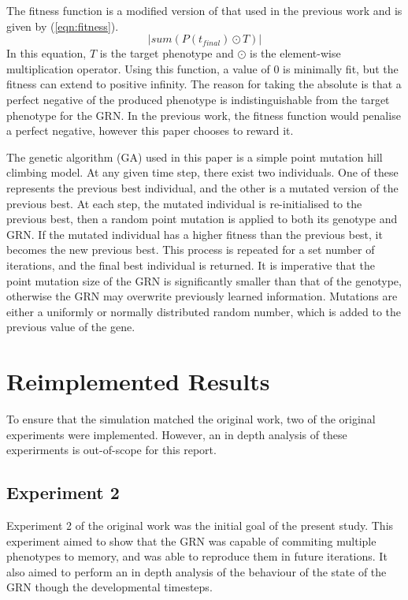 \documentclass[twocolumn,a4paper,11pt]{article}
\begin{document}
    The fitness function is a modified version of that used in the previous work and is given by (\ref{eqn:fitness}).
    \begin{equation} \label{eqn:fitness}
        |{sum} (P(t_{final}) \odot T)|
    \end{equation}
    In this equation, $T$ is the target phenotype and $\odot$ is the element-wise multiplication operator. Using this function, a value of 0 is minimally fit, but the fitness can extend to positive infinity. The reason for taking the absolute is that a perfect negative of the produced phenotype is indistinguishable from the target phenotype for the GRN. In the previous work, the fitness function would penalise a perfect negative, however this paper chooses to reward it.

    The genetic algorithm (GA) used in this paper is a simple point mutation hill climbing model. At any given time step, there exist two individuals. One of these represents the previous best individual, and the other is a mutated version of the previous best. At each step, the mutated individual is re-initialised to the previous best, then a random point mutation is applied to both its genotype and GRN. If the mutated individual has a higher fitness than the previous best, it becomes the new previous best. This process is repeated for a set number of iterations, and the final best individual is returned. It is imperative that the point mutation size of the GRN is significantly smaller than that of the genotype, otherwise the GRN may overwrite previously learned information. Mutations are either a uniformly or normally distributed random number, which is added to the previous value of the gene.

    \section{Reimplemented Results}
    To ensure that the simulation matched the original work, two of the original experiments were implemented. However, an in depth analysis of these experirments is out-of-scope for this report.

    \subsection{Experiment 2}
    Experiment 2 of the original work was the initial goal of the present study. This experiment aimed to show that the GRN was capable of commiting multiple phenotypes to memory, and was able to reproduce them in future iterations. It also aimed to perform an in depth analysis of the behaviour of the state of the GRN though the developmental timesteps.
    
\end{document}
